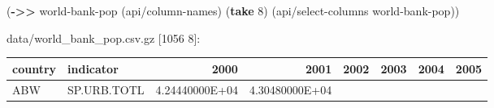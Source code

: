 \documentclass[]{article}
\newenvironment{Shaded}{\begin{snugshade}}{\end{snugshade}}
\newcommand{\KeywordTok}[1]{\textcolor[rgb]{0.13,0.29,0.53}{\textbf{#1}}}
\newcommand{\DecValTok}[1]{\textcolor[rgb]{0.00,0.00,0.81}{#1}}
\newcommand{\NormalTok}[1]{#1}
\begin{document}
\begin{Shaded}
\begin{Highlighting}[]
\NormalTok{(}\KeywordTok{->>}\NormalTok{ world-bank-pop}
\NormalTok{     (api/column-names)}
\NormalTok{     (}\KeywordTok{take} \DecValTok{8}\NormalTok{)}
\NormalTok{     (api/select-columns world-bank-pop))}
\end{Highlighting}
\end{Shaded}

data/world\_bank\_pop.csv.gz {[}1056 8{]}:

\begin{longtable}[]{@{}llrrrrrr@{}}
\toprule
\begin{minipage}[b]{0.06\columnwidth}\raggedright\strut
country\strut
\end{minipage} & \begin{minipage}[b]{0.08\columnwidth}\raggedright\strut
indicator\strut
\end{minipage} & \begin{minipage}[b]{0.11\columnwidth}\raggedleft\strut
2000\strut
\end{minipage} & \begin{minipage}[b]{0.11\columnwidth}\raggedleft\strut
2001\strut
\end{minipage} & \begin{minipage}[b]{0.11\columnwidth}\raggedleft\strut
2002\strut
\end{minipage} & \begin{minipage}[b]{0.11\columnwidth}\raggedleft\strut
2003\strut
\end{minipage} & \begin{minipage}[b]{0.11\columnwidth}\raggedleft\strut
2004\strut
\end{minipage} & \begin{minipage}[b]{0.11\columnwidth}\raggedleft\strut
2005\strut
\end{minipage}\tabularnewline
\midrule
\endhead
\begin{minipage}[t]{0.06\columnwidth}\raggedright\strut
ABW\strut
\end{minipage} & \begin{minipage}[t]{0.08\columnwidth}\raggedright\strut
SP.URB.TOTL\strut
\end{minipage} & \begin{minipage}[t]{0.11\columnwidth}\raggedleft\strut
4.24440000E+04\strut
\end{minipage} & \begin{minipage}[t]{0.11\columnwidth}\raggedleft\strut
4.30480000E+04\strut

\end{minipage}
\end{longtable}
\end{document}
